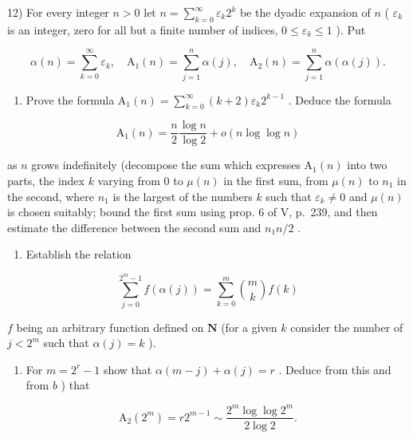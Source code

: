 12) For every integer \(n > 0\) let \(n = \sum_{k=0}^{\infty} \varepsilon_k 2^k\) be the dyadic expansion of \(n\) ( \(\varepsilon_k\) is an integer, zero for all but a finite number of indices, \(0 \leqslant \varepsilon_k \leqslant 1\) ). Put

\[
\alpha (n) = \sum_ {k = 0} ^ {\infty} \varepsilon_ {k}, \quad \mathrm{A} _ {1} (n) = \sum_ {j = 1} ^ {n} \alpha (j), \quad \mathrm{A} _ {2} (n) = \sum_ {j = 1} ^ {n} \alpha (\alpha (j)).
\]

\begin{enumerate}
\def\labelenumi{\alph{enumi})}
\tightlist
\item
  Prove the formula \(\mathrm{A}_1(n) = \sum_{k=0}^{\infty}(k+2)\varepsilon_k 2^{k-1}\) . Deduce the formula
\end{enumerate}

\[
\mathrm{A} _ {1} (n) = \frac {n}{2} \frac {\log n}{\log 2} + o (n \log \log n)
\]

as \(n\) grows indefinitely (decompose the sum which expresses \(\mathrm{A}_1(n)\) into two parts, the index \(k\) varying from 0 to \(\mu(n)\) in the first sum, from \(\mu(n)\) to \(n_1\) in the second, where \(n_1\) is the largest of the numbers \(k\) such that \(\varepsilon_k \neq 0\) and \(\mu(n)\) is chosen suitably; bound the first sum using prop. 6 of V, p.~239, and then estimate the difference between the second sum and \(n_1n / 2\) .

\begin{enumerate}
\def\labelenumi{\alph{enumi})}
\setcounter{enumi}{1}
\tightlist
\item
  Establish the relation
\end{enumerate}

\[
\sum_ {j = 0} ^ {2 ^ {m} - 1} f (\alpha (j)) = \sum_ {k = 0} ^ {m} \binom {m} {k} f (k)
\]

\(f\) being an arbitrary function defined on \(\mathbf{N}\) (for a given \(k\) consider the number of \(j < 2^{m}\) such that \(\alpha(j) = k\) ).

\begin{enumerate}
\def\labelenumi{\alph{enumi})}
\setcounter{enumi}{2}
\tightlist
\item
  For \(m = 2^r - 1\) show that \(\alpha(m - j) + \alpha(j) = r\) . Deduce from this and from \(b\) ) that
\end{enumerate}

\[
\mathrm{A} _ {2} (2 ^ {m}) = r 2 ^ {m - 1} \sim \frac {2 ^ {m} \log \log 2 ^ {m}}{2 \log 2}.
\]

